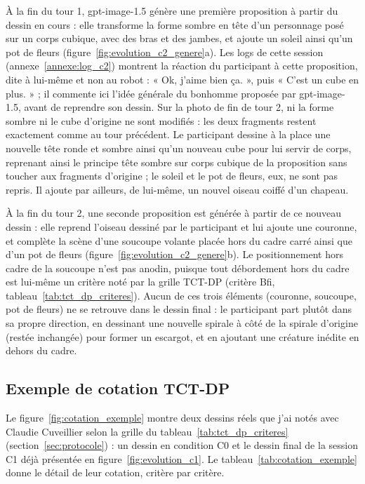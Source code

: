 \documentclass[11pt]{article}
\begin{document}
À la fin du tour 1, gpt-image-1.5 génère une première proposition à partir du dessin en cours : elle transforme la forme sombre en tête d'un personnage posé sur un corps cubique, avec des bras et des jambes, et ajoute un soleil ainsi qu'un pot de fleurs (figure~\ref{fig:evolution_c2_genere}a).
Les logs de cette session (annexe~\ref{annexe:log_c2}) montrent la réaction du participant à cette proposition, dite à lui-même et non au robot : « Ok, j'aime bien ça. », puis « C'est un cube en plus. » ; il commente ici l'idée générale du bonhomme proposée par gpt-image-1.5, avant de reprendre son dessin.
Sur la photo de fin de tour 2, ni la forme sombre ni le cube d'origine ne sont modifiés : les deux fragments restent exactement comme au tour précédent.
Le participant dessine à la place une nouvelle tête ronde et sombre ainsi qu'un nouveau cube pour lui servir de corps, reprenant ainsi le principe tête sombre sur corps cubique de la proposition sans toucher aux fragments d'origine ; le soleil et le pot de fleurs, eux, ne sont pas repris.
Il ajoute par ailleurs, de lui-même, un nouvel oiseau coiffé d'un chapeau.

À la fin du tour 2, une seconde proposition est générée à partir de ce nouveau dessin : elle reprend l'oiseau dessiné par le participant et lui ajoute une couronne, et complète la scène d'une soucoupe volante placée hors du cadre carré ainsi que d'un pot de fleurs (figure~\ref{fig:evolution_c2_genere}b).
Le positionnement hors cadre de la soucoupe n'est pas anodin, puisque tout débordement hors du cadre est lui-même un critère noté par la grille TCT-DP (critère Bfi, tableau~\ref{tab:tct_dp_criteres}).
Aucun de ces trois éléments (couronne, soucoupe, pot de fleurs) ne se retrouve dans le dessin final : le participant part plutôt dans sa propre direction, en dessinant une nouvelle spirale à côté de la spirale d'origine (restée inchangée) pour former un escargot, et en ajoutant une créature inédite en dehors du cadre.

\subsection{Exemple de cotation TCT-DP}
\label{sec:cotation_exemple}

Le figure~\ref{fig:cotation_exemple} montre deux dessins réels que j'ai notés avec Claudie Cuveillier selon la grille du tableau~\ref{tab:tct_dp_criteres} (section~\ref{sec:protocole}) :
un dessin en condition C0 et le dessin final de la session C1 déjà présentée en figure~\ref{fig:evolution_c1}.
Le tableau~\ref{tab:cotation_exemple} donne le détail de leur cotation, critère par critère.
\end{document}
